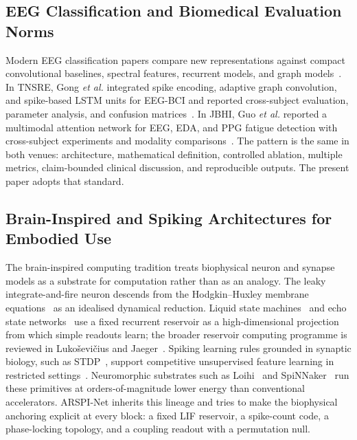 \documentclass[journal]{IEEEtran}
\begin{document}
\subsection{EEG Classification and Biomedical Evaluation Norms}
Modern EEG classification papers compare new representations against compact convolutional baselines, spectral features, recurrent models, and graph models~\cite{lawhern2018eegnet,craik2019deep,klepl2024gnn}. In TNSRE, Gong \emph{et al.} integrated spike encoding, adaptive graph convolution, and spike-based LSTM units for EEG-BCI and reported cross-subject evaluation, parameter analysis, and confusion matrices~\cite{gong2023sglnet}. In JBHI, Guo \emph{et al.} reported a multimodal attention network for EEG, EDA, and PPG fatigue detection with cross-subject experiments and modality comparisons~\cite{guo2025mma}. The pattern is the same in both venues: architecture, mathematical definition, controlled ablation, multiple metrics, claim-bounded clinical discussion, and reproducible outputs. The present paper adopts that standard.

\subsection{Brain-Inspired and Spiking Architectures for Embodied Use}
The brain-inspired computing tradition treats biophysical neuron and synapse models as a substrate for computation rather than as an analogy. The leaky integrate-and-fire neuron descends from the Hodgkin--Huxley membrane equations~\cite{hodgkin1952quantitative} as an idealised dynamical reduction. Liquid state machines~\cite{maass2002liquid} and echo state networks~\cite{jaeger2001echo} use a fixed recurrent reservoir as a high-dimensional projection from which simple readouts learn; the broader reservoir computing programme is reviewed in Luko\v{s}evi\v{c}ius and Jaeger~\cite{lukosevicius2009reservoir}. Spiking learning rules grounded in synaptic biology, such as STDP~\cite{bipoo1998stdp}, support competitive unsupervised feature learning in restricted settings~\cite{diehl2015unsupervised}. Neuromorphic substrates such as Loihi~\cite{davies2018loihi} and SpiNNaker~\cite{furber2014spinnaker} run these primitives at orders-of-magnitude lower energy than conventional accelerators. ARSPI-Net inherits this lineage and tries to make the biophysical anchoring explicit at every block: a fixed LIF reservoir, a spike-count code, a phase-locking topology, and a coupling readout with a permutation null.
\end{document}
